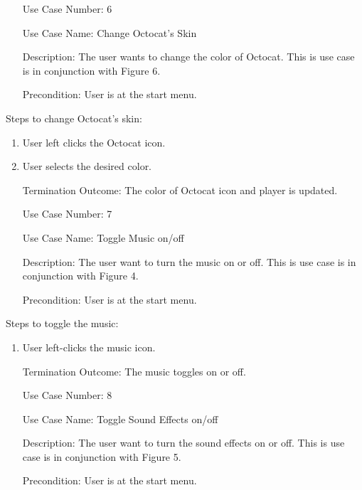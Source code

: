 \documentclass[10pt,conference,onecolumn,compsoc]{IEEEtran}
\begin{document}
\begin{itemize}
\item[Use Case Number:] 6
\item[Use Case Name:] Change Octocat's Skin
\item[Description:] The user wants to change the color of Octocat. This is use case is in conjunction with Figure 6.
\item[Precondition:] User is at the start menu.
\end{itemize}

Steps to change Octocat's skin:

\begin{enumerate}
\item User left clicks the Octocat icon.
\item User selects the desired color.
\item[Termination Outcome:] The color of Octocat icon and player is updated.\\
\end{enumerate}

\begin{itemize}
\item[Use Case Number:] 7
\item[Use Case Name:] Toggle Music on/off
\item[Description:] The user want to turn the music on or off. This is use case is in conjunction with Figure 4.
\item[Precondition:] User is at the start menu.
\end{itemize}

Steps to toggle the music:

\begin{enumerate}
\item User left-clicks the music icon.
\item[Termination Outcome:] The music toggles on or off.\\
\end{enumerate}

\begin{itemize}
\item[Use Case Number:] 8
\item[Use Case Name:] Toggle Sound Effects on/off
\item[Description:] The user want to turn the sound effects  on or off. This is use case is in conjunction with Figure 5.
\item[Precondition:] User is at the start menu.
\end{itemize}
\end{document}
